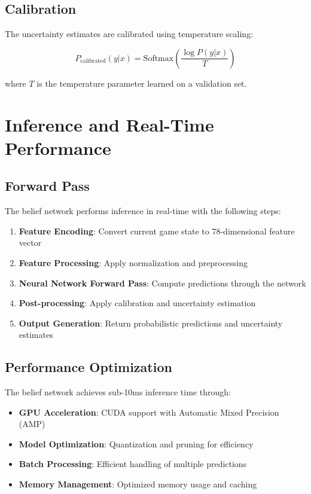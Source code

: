 \documentclass[conference]{IEEEtran}
\begin{document}
\subsection{Calibration}

The uncertainty estimates are calibrated using temperature scaling:

\begin{equation}
P_{\text{calibrated}}(y|x) = \text{Softmax}\left(\frac{\log P(y|x)}{T}\right)
\end{equation}

where $T$ is the temperature parameter learned on a validation set.

\section{Inference and Real-Time Performance}

\subsection{Forward Pass}

The belief network performs inference in real-time with the following steps:

\begin{enumerate}
    \item \textbf{Feature Encoding}: Convert current game state to 78-dimensional feature vector
    \item \textbf{Feature Processing}: Apply normalization and preprocessing
    \item \textbf{Neural Network Forward Pass}: Compute predictions through the network
    \item \textbf{Post-processing}: Apply calibration and uncertainty estimation
    \item \textbf{Output Generation}: Return probabilistic predictions and uncertainty estimates
\end{enumerate}

\subsection{Performance Optimization}

The belief network achieves sub-10ms inference time through:

\begin{itemize}
    \item \textbf{GPU Acceleration}: CUDA support with Automatic Mixed Precision (AMP)
    \item \textbf{Model Optimization}: Quantization and pruning for efficiency
    \item \textbf{Batch Processing}: Efficient handling of multiple predictions
    \item \textbf{Memory Management}: Optimized memory usage and caching
\end{itemize}
\end{document}
